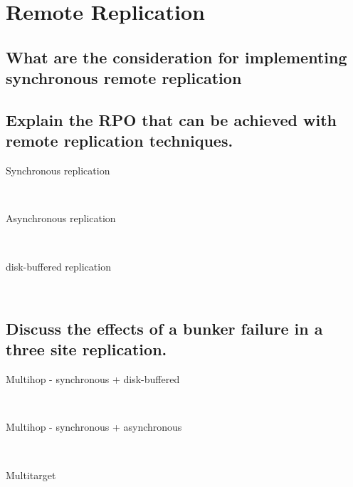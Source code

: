 \section{Remote Replication} %
\label{sec:remote_replication}

\subsection{What are the consideration for implementing synchronous remote replication} %
\label{sub:what_are_the_consideration_for_implementing_synchronous_remote_replication}


\subsection{Explain the RPO that can be achieved with remote replication techniques.} %
\label{sub:explain_the_rpo_that_can_be_achieved_with_remote_replication_techniques}

	\begin{description}
		\item[Synchronous replication] \hfill \\
		\item[Asynchronous replication] \hfill \\
		\item[disk-buffered replication] \hfill \\
	\end{description}


\subsection{Discuss the effects of a bunker failure in a three site replication.} %
\label{sub:discuss_the_effects_of_a_bunker_failure}

	\begin{description}
		\item[Multihop - synchronous + disk-buffered] \hfill \\
		\item[Multihop - synchronous + asynchronous] \hfill \\
		\item[Multitarget] \hfill \\
	\end{description}

